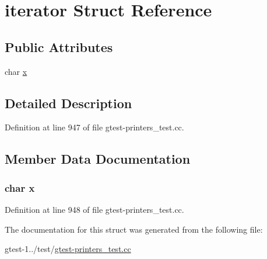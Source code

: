 \hypertarget{structtesting_1_1gtest__printers__test_1_1iterator}{\section{iterator \-Struct \-Reference}
\label{d5/d66/structtesting_1_1gtest__printers__test_1_1iterator}
}
\subsection*{\-Public \-Attributes}
\begin{DoxyCompactItemize}
\item 
char \hyperlink{structtesting_1_1gtest__printers__test_1_1iterator_ab06e9aa782b61ccfb42f7c48996f6ed4}{x}
\end{DoxyCompactItemize}


\subsection{\-Detailed \-Description}


\-Definition at line 947 of file gtest-\/printers\-\_\-test.\-cc.



\subsection{\-Member \-Data \-Documentation}
\hypertarget{structtesting_1_1gtest__printers__test_1_1iterator_ab06e9aa782b61ccfb42f7c48996f6ed4}{
\subsubsection[{x}]{\setlength{\rightskip}{0pt plus 5cm}char {\bf x}}}\label{d5/d66/structtesting_1_1gtest__printers__test_1_1iterator_ab06e9aa782b61ccfb42f7c48996f6ed4}


\-Definition at line 948 of file gtest-\/printers\-\_\-test.\-cc.



\-The documentation for this struct was generated from the following file\-:\begin{DoxyCompactItemize}
\item 
gtest-\/1../test/\hyperlink{gtest-printers__test_8cc}{gtest-\/printers\-\_\-test.\-cc}\end{DoxyCompactItemize}
